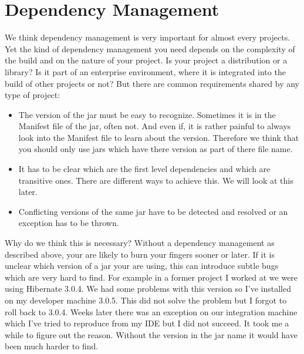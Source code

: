 \chapter{Dependency Management}

We think dependency management is very important for almost every projects. Yet the kind of dependency management you need depends on the complexity of the build and on the nature of your project. Is your project a distribution or a library? Is it part of an enterprise environment, where it is integrated into the build of other projects or not? But there are common requirements shared by any type of project:
\begin{itemize}
\item The version of the jar must be easy to recognize. Sometimes it is in the Manifest file of the jar, often not. And even if, it is rather painful to always look into the Manifest file to learn about the version. Therefore we think that you should only use jars which have there version as part of there file name.
\item It has to be clear which are the first level dependencies and which are transitive ones. There are different ways to achieve this. We will look at this later.
\item Conflicting versions of the same jar have to be detected and resolved or an exception has to be thrown.
\end{itemize}

Why do we think this is necessary? Without a dependency management as described above, your are likely to burn your fingers sooner or later. If it is unclear which version of a jar your are using, this can introduce subtle bugs which are very hard to find. For example in a former project I worked at we were using Hibernate 3.0.4. We had some problems with this version so I've installed on my developer machine 3.0.5. This did not solve the problem but I forgot to roll back to 3.0.4. Weeks later there was an exception on our integration machine which I've tried to reproduce from my IDE but I did not succeed. It took me a while to figure out the reason. Without the version in the jar name it would have been much harder to find.

